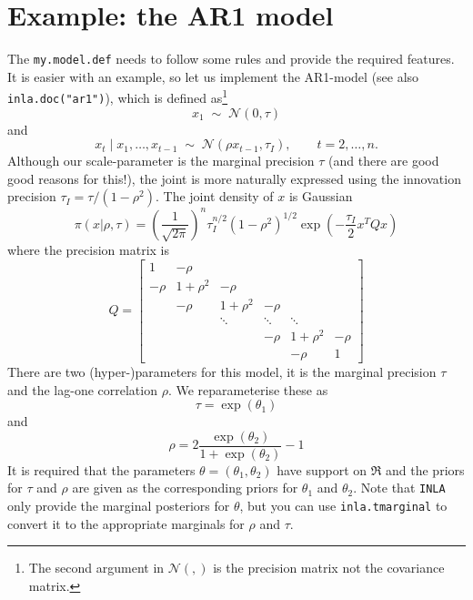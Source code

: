\documentclass[a4paper,11pt]{article}
\begin{document}
\section*{Example: the AR1 model}

The \texttt{my.model.def} needs to follow some rules and provide the
required features. It is easier with an example, so let us implement
the AR1-model (see also \texttt{inla.doc("ar1")}), which is defined
as\footnote{The second argument in ${\mathcal N}(,)$ is the precision
    matrix not the covariance matrix.}
\begin{displaymath}
    x_{1} \;\sim\; {\mathcal N}(0, \tau)
\end{displaymath}
and
\begin{displaymath}
    x_{t} \mid x_{1}, \ldots, x_{t-1} \;\sim\; {\mathcal N}(\rho
    x_{t-1}, \tau_{I}), \qquad t=2, \ldots,n.
\end{displaymath}
Although our scale-parameter is the marginal precision $\tau$ (and
there are good good reasons for this!), the joint is more naturally
expressed using the innovation precision $\tau_{I} =
\tau/(1-\rho^{2})$. The joint density of $x$ is Gaussian
\begin{displaymath}
    \pi(x|\rho,\tau) = \left(\frac{1}{\sqrt{2\pi}}\right)^{n}
    \tau_{I}^{n/2} (1-\rho^{2})^{1/2}
    \exp\left(-\frac{\tau_{I}}{2} x^{T} Q x\right)
\end{displaymath}
where the precision matrix is
\begin{displaymath}
    Q =
    \begin{bmatrix}
        1 & -\rho &&&& \\
        -\rho & 1+\rho^{2}& -\rho &&& \\
        &-\rho & 1+\rho^{2}& -\rho && \\
        && \ddots& \ddots& \ddots& \\
        &       &       &       -\rho & 1 + \rho^{2} & -\rho\\
        &       &       &       & -\rho & 1
    \end{bmatrix}
\end{displaymath}
There are two (hyper-)parameters for this model, it is the marginal
precision $\tau$ and the lag-one correlation $\rho$.  We
reparameterise these as
\begin{displaymath}
    \tau = \exp(\theta_1) 
\end{displaymath}
and
\begin{displaymath}
    \rho = 2\frac{\exp(\theta_{2})}{1+\exp(\theta_{2})} - 1
\end{displaymath}
It is required that the parameters $\theta = (\theta_{1}, \theta_{2})$
have support on $\Re$ and the priors for $\tau$ and $\rho$ are given
as the corresponding priors for $\theta_{1}$ and $\theta_{2}$. Note
that \texttt{INLA} only provide the marginal posteriors for $\theta$,
but you can use \texttt{inla.tmarginal} to convert it to the
appropriate marginals for $\rho$ and $\tau$.
\end{document}

